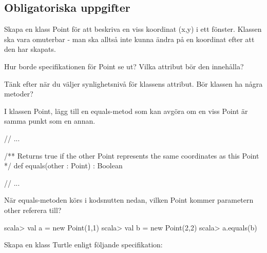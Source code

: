 \subsection{Obligatoriska uppgifter}

\Task Skapa en klass Point för att beskriva en viss koordinat (x,y) i ett fönster. Klassen ska vara omuterbar - man ska alltså inte kunna ändra på en koordinat efter att den har skapats.

\Subtask Hur borde specifikationen för Point se ut? Vilka attribut bör den innehålla?

\Subtask Tänk efter när du väljer synlighetsnivå för klassens attribut. Bör klassen ha några metoder?

\Subtask I klassen Point, lägg till en equals-metod som kan avgöra om en viss Point är samma punkt som en annan.

\begin{Code}
// ...

/** Returns true if the other Point represents
    the same coordinates as this Point */
def equals(other : Point) : Boolean

// ...
\end{Code}

\Subtask När equals-metoden körs i kodsnutten nedan, vilken Point kommer parametern other referera till?
\begin{REPL}
scala> val a = new Point(1,1)
scala> val b = new Point(2,2)
scala> a.equals(b)
\end{REPL}

\Task Skapa en klass Turtle enligt följande specifikation:

